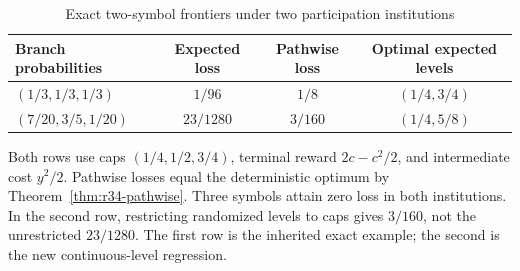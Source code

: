 \begin{table}[!htbp]\centering
\caption{Exact two-symbol frontiers under two participation institutions}\label{tab:r34-frontiers}
\begin{tabular}{@{}lccc@{}}\toprule
Branch probabilities & Expected loss & Pathwise loss & Optimal expected levels\\\midrule
$(1/3,1/3,1/3)$ & $1/96$ & $1/8$ & $(1/4,3/4)$\\
$(7/20,3/5,1/20)$ & $23/1280$ & $3/160$ & $(1/4,5/8)$\\\bottomrule
\end{tabular}
\par\smallskip\begin{minipage}{.96\textwidth}\small
Both rows use caps $(1/4,1/2,3/4)$, terminal reward $2c-c^2/2$, and intermediate cost $y^2/2$. Pathwise losses equal the deterministic optimum by Theorem~\ref{thm:r34-pathwise}. Three symbols attain zero loss in both institutions. In the second row, restricting randomized levels to caps gives $3/160$, not the unrestricted $23/1280$. The first row is the inherited exact example; the second is the new continuous-level regression.\end{minipage}
\end{table}
